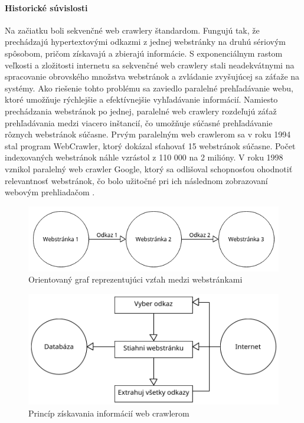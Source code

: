 \documentclass[10pt,twoside,slovak,a4paper]{article}
\begin{document}
\paragraph{Historické súvislosti}

Na začiatku boli sekvenčné web crawlery štandardom. Fungujú tak, že prechádzajú hypertextovými odkazmi z jednej webstránky na druhú sériovým spôsobom, pričom získavajú a zbierajú informácie. S exponenciálnym rastom veľkosti a zložitosti internetu sa sekvenčné web crawlery stali neadekvátnymi na spracovanie obrovského množstva webstránok a zvládanie zvyšujúcej sa záťaže na systémy. Ako riešenie tohto problému sa zaviedlo paralelné prehľadávanie webu, ktoré umožňuje rýchlejšie a efektívnejšie vyhľadávanie informácií. Namiesto prechádzania webstránok po jednej, paralelné web crawlery rozdeľujú záťaž prehľadávania medzi viacero inštancií, čo umožňuje súčasné prehľadávanie rôznych webstránok súčasne. Prvým paralelným web crawlerom sa v roku 1994 stal program WebCrawler, ktorý dokázal sťahovať 15 webstránok súčasne. Počet indexovaných webstránok náhle vzrástol z 110 000 na 2 milióny. V roku 1998 vznikol paralelný web crawler Google, ktorý sa odlišoval schopnosťou ohodnotiť relevantnosť webstránok, čo bolo užitočné pri ich následnom zobrazovaní webovým prehliadačom \cite{mirtaheri2014brief}.

\begin{figure}[hbt!]
    \centering
    \includegraphics[width=\linewidth]{diagram1.png}
    \caption{Orientovaný graf reprezentujúci vzťah medzi webstránkami}
\end{figure}

\begin{figure}[hbt!]
    \centering
    \includegraphics[width=\linewidth]{diagram2.png}
    \caption{Princíp získavania informácií web crawlerom \cite{kausar2013web}}
\end{figure}
\end{document}
